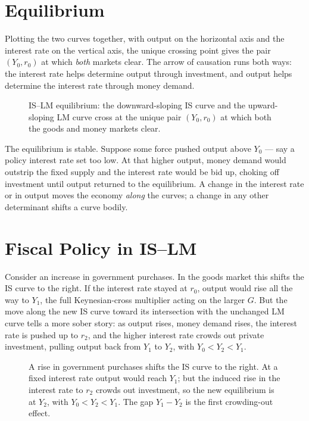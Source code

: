 \section{Equilibrium}

Plotting the two curves together, with output on the horizontal axis and the interest rate on the vertical axis, the unique crossing point gives the pair $(Y_0,r_0)$ at which \emph{both} markets clear. The arrow of causation runs both ways: the interest rate helps determine output through investment, and output helps determine the interest rate through money demand.

\begin{figure}[h]
\centering

\caption{IS--LM equilibrium: the downward-sloping IS curve and the upward-sloping LM curve cross at the unique pair $(Y_0,r_0)$ at which both the goods and money markets clear.}
\label{fig:macro-21}
\end{figure}

The equilibrium is stable. Suppose some force pushed output above $Y_0$ --- say a policy interest rate set too low. At that higher output, money demand would outstrip the fixed supply and the interest rate would be bid up, choking off investment until output returned to the equilibrium. A change in the interest rate or in output moves the economy \emph{along} the curves; a change in any other determinant shifts a curve bodily.

\section{Fiscal Policy in IS--LM}

Consider an increase in government purchases. In the goods market this shifts the IS curve to the right. If the interest rate stayed at $r_0$, output would rise all the way to $Y_1$, the full Keynesian-cross multiplier acting on the larger $G$. But the move along the new IS curve toward its intersection with the unchanged LM curve tells a more sober story: as output rises, money demand rises, the interest rate is pushed up to $r_2$, and the higher interest rate crowds out private investment, pulling output back from $Y_1$ to $Y_2$, with $Y_0<Y_2<Y_1$.

\begin{figure}[h]
\centering

\caption{A rise in government purchases shifts the IS curve to the right. At a fixed interest rate output would reach $Y_1$; but the induced rise in the interest rate to $r_2$ crowds out investment, so the new equilibrium is at $Y_2$, with $Y_0<Y_2<Y_1$. The gap $Y_1-Y_2$ is the first crowding-out effect.}
\label{fig:macro-22}
\end{figure}

